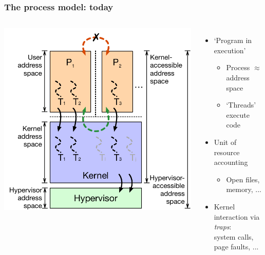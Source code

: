 \begin{frame}
  \frametitle{The process model: today}

  \begin{columns}[T]
      \vspace{0.5cm}
      \includegraphics[width=1.1\textwidth]{../../figures/kernel-user-threads.pdf}

      \pause

      \begin{itemize}
        \item `Program in execution'
	\begin{itemize}
	  \item Process $\approx$ address space
          \item `Threads' execute code
	\end{itemize}


	\pause

	\item Unit of resource accounting
	\begin{itemize}
	  \item Open files, memory, ...
	\end{itemize}

	\pause

        \item Kernel interaction via \textit{traps}: \\
	  system calls, page faults, ...


\end{itemize}
\end{columns}
\end{frame}
